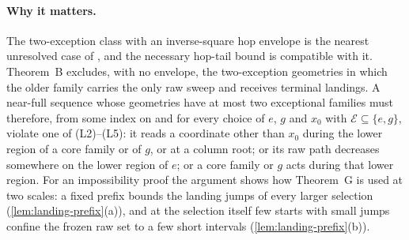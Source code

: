 \paragraph{Why it matters.}
The two-exception class with an inverse-square hop envelope is the nearest unresolved
case of \cite[Section~9.1]{SourceCovers2026}, and the necessary hop-tail bound
\cite[Theorem~4.2]{SourceCovers2026} is compatible with it. Theorem~B excludes, with no
envelope, the two-exception geometries in which the older family carries the only raw
sweep and receives terminal landings. A near-full sequence whose geometries have at
most two exceptional families must therefore, from some index on and for every choice
of $e$, $g$ and $x_0$ with $\mathcal E\subseteq\{e,g\}$, violate one of (L2)--(L5): it reads a coordinate
other than $x_0$ during the lower region of a core family or of $g$, or at a column
root; or its raw path decreases somewhere on the lower region of $e$; or a core family
or $g$ acts during that lower region. For an impossibility proof the argument shows
how Theorem~G is used at two scales: a fixed prefix bounds the landing jumps of every
larger selection (\cref{lem:landing-prefix}(a)), and at the selection itself few
starts with small jumps confine the frozen raw set to a few short intervals
(\cref{lem:landing-prefix}(b)).
